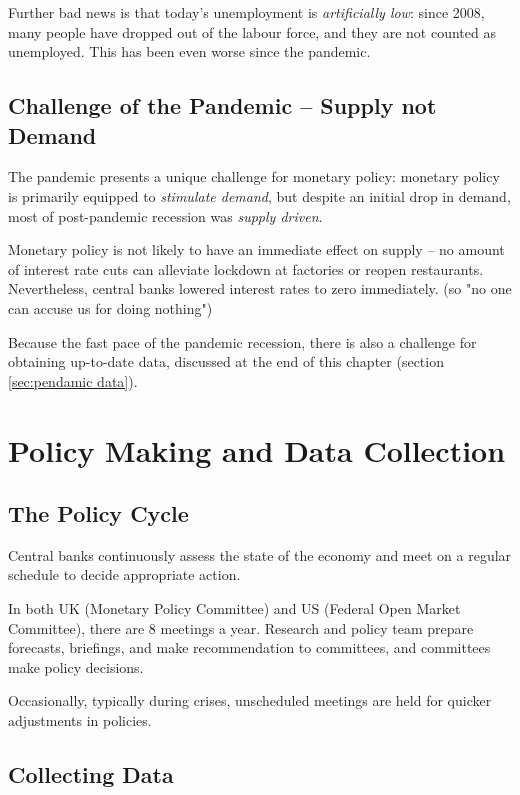         Further bad news is that today's unemployment is \emph{artificially low}: since 2008, many people have dropped out of the labour force, and they are not counted as unemployed. This has been even worse since the pandemic.

    \subsection{Challenge of the Pandemic -- Supply not Demand}

        The pandemic presents a unique challenge for monetary policy: monetary policy is primarily equipped to \emph{stimulate demand}, but despite an initial drop in demand, most of post-pandemic recession was \emph{supply driven}.

        Monetary policy is not likely to have an immediate effect on supply -- no amount of interest rate cuts can alleviate lockdown at factories or reopen restaurants. Nevertheless, central banks lowered interest rates to zero immediately. (so "no one can accuse us for doing nothing")

        Because the fast pace of the pandemic recession, there is also a challenge for obtaining up-to-date data, discussed at the end of this chapter (section \ref{sec:pendamic data}).

\section{Policy Making and Data Collection}

    \subsection{The Policy Cycle}

        Central banks continuously assess the state of the economy and meet on a regular schedule to decide appropriate action.

        In both UK (Monetary Policy Committee) and US (Federal Open Market Committee), there are 8 meetings a year. Research and policy team prepare forecasts, briefings, and make recommendation to committees, and committees make policy decisions.

        Occasionally, typically during crises, unscheduled meetings are held for quicker adjustments in policies.
        
    \subsection{Collecting Data}

